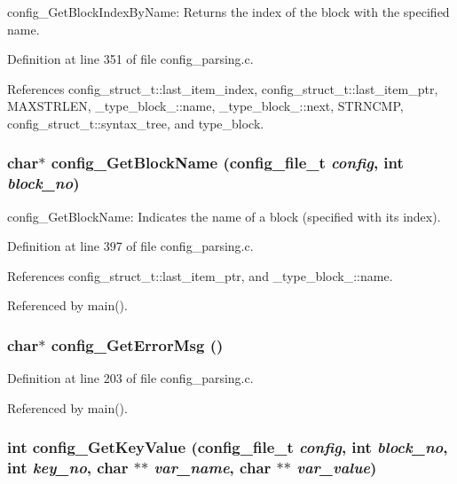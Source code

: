 config\_\-Get\-Block\-Index\-By\-Name: Returns the index of the block with the specified name. 

Definition at line 351 of file config\_\-parsing.c.

References config\_\-struct\_\-t::last\_\-item\_\-index, config\_\-struct\_\-t::last\_\-item\_\-ptr, MAXSTRLEN, \_\-type\_\-block\_\-::name, \_\-type\_\-block\_\-::next, STRNCMP, config\_\-struct\_\-t::syntax\_\-tree, and type\_\-block.
\subsubsection{\setlength{\rightskip}{0pt plus 5cm}char$\ast$ config\_\-Get\-Block\-Name (config\_\-file\_\-t {\em config}, int {\em block\_\-no})}\label{config__parsing_8c_a13}


config\_\-Get\-Block\-Name: Indicates the name of a block (specified with its index). 

Definition at line 397 of file config\_\-parsing.c.

References config\_\-struct\_\-t::last\_\-item\_\-ptr, and \_\-type\_\-block\_\-::name.

Referenced by main().
\subsubsection{\setlength{\rightskip}{0pt plus 5cm}char$\ast$ config\_\-Get\-Error\-Msg ()}\label{config__parsing_8c_a7}




Definition at line 203 of file config\_\-parsing.c.

Referenced by main().
\subsubsection{\setlength{\rightskip}{0pt plus 5cm}int config\_\-Get\-Key\-Value (config\_\-file\_\-t {\em config}, int {\em block\_\-no}, int {\em key\_\-no}, char $\ast$$\ast$ {\em var\_\-name}, char $\ast$$\ast$ {\em var\_\-value})}\label{config__parsing_8c_a15}


